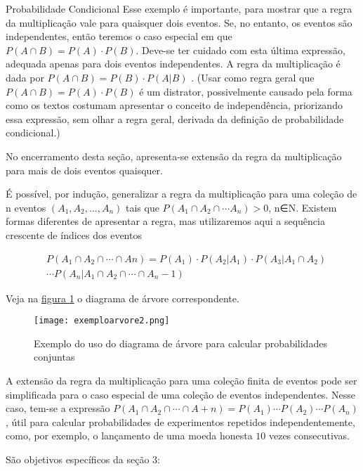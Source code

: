 \begin{paginatexto}{Probabilidade Condicional}
Esse exemplo é importante, para mostrar que a regra da multiplicação vale para quaisquer dois eventos. Se, no entanto, os eventos são independentes, então teremos o caso especial em que $P(A\cap B)=P(A)\cdot P(B)$. Deve-se ter cuidado com esta última expressão, adequada apenas para dois eventos independentes. A regra da multiplicação é dada por $P(A\cap B)=P(B)\cdot P(A|B)$ . (Usar como regra geral que $P(A\cap B)=P(A)\cdot P(B)$ é um distrator, possivelmente causado pela forma como os textos costumam apresentar o conceito de independência, priorizando essa expressão, sem olhar a regra geral, derivada da definição de probabilidade condicional.)

No encerramento desta seção, apresenta-se extensão da regra da multiplicação para mais de dois eventos quaisquer.

É possível, por indução, generalizar a regra da multiplicação para uma coleção de n eventos $(A_1,A_2,...,A_n)$ tais que $P(A_1\cap A_2\cap \cdots A_n)>0$, n∈N. Existem formas diferentes de apresentar a regra, mas utilizaremos aqui a sequência crescente de índices dos eventos

{\small
\begin{align*}
&P(A_1\cap A_2\cap \cdots\cap An)=P(A_1)\cdot P(A_2|A_1)\cdot P(A_3|A_1\cap A_2)\\
&\cdots P(A_n|A_1\cap A_2\cap\cdots\cap A_n−1)
\end{align*}}

Veja na \hyperref[exemploarvore2]{figura \ref{exemploarvore2}} o diagrama de árvore correspondente.
\begin{figure}[H]
\centering

\texttt{[image: exemploarvore2.png]}
\caption{Exemplo do uso do diagrama de árvore para calcular probabilidades conjuntas}
\label{exemploarvore2}
\end{figure}

A extensão da regra da multiplicação para uma coleção finita de eventos pode ser simplificada para o caso especial de uma coleção de eventos independentes. Nesse caso, tem-se a expressão $P(A_1\cap A_2\cap\cdots\cap A+n)=P(A_1)\cdots P(A_2)\cdots P(A_n)$, útil para calcular probabilidades de experimentos repetidos independentemente, como, por exemplo, o lançamento de uma moeda honesta $10$ vezes consecutivas.

São objetivos específicos da seção 3:


\end{paginatexto}

